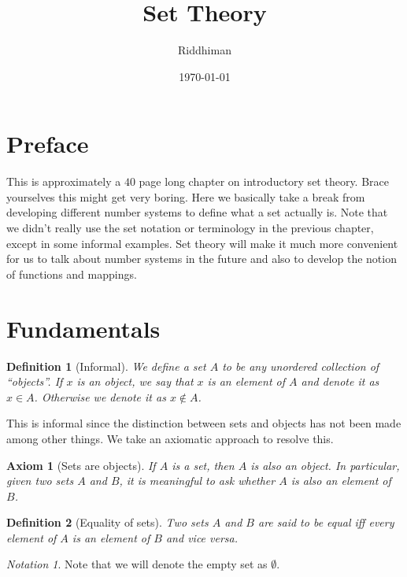 \documentclass[12pt]{article}
\title{Set Theory}
\author{Riddhiman}
\date{\monthyeardate\today}
\newtheorem{axiom}{Axiom}
\newtheorem{definition}{Definition}[section]
\theoremstyle{remark}
\newtheorem*{notation}{Notation}
\begin{document}
\maketitle

\section{Preface}%
\label{sec:Preface}

This is approximately a $ 40 $ page long chapter on introductory set theory. Brace yourselves this might get very boring. Here we basically take a break from developing different number systems to define what a set actually is. Note that we didn't really use the set notation or terminology in the previous chapter, except in some informal examples. Set theory will make it much more convenient for us to talk about number systems in the future and also to develop the notion of functions and mappings.  

\section{Fundamentals}%
\label{sec:Fundamentals}
 
\begin{definition}[Informal]
	We define a \textit{set} $ A $ to be any unordered collection of ``objects''. If $ x $ is an object, we say that $ x $ \textit{is an element of} $ A $ and denote it as $ x \in A $. Otherwise we denote it as $ x \notin A $.
\end{definition}
 
This is informal since the distinction between sets and objects has not been made among other things. We take an axiomatic approach to resolve this. 

\begin{axiom}[Sets are objects]
    If $ A $ is a set, then $ A $ is also an object. In particular, given two sets $ A $ and $ B $, it is meaningful to ask whether $ A $ is also an element of $ B $. 
\end{axiom}

\begin{definition}[Equality of sets]
    Two sets $ A $ and $ B $ are said to be equal iff every element of $ A $ is an element of $ B $ and vice versa.
\end{definition}

\begin{notation}
    Note that we will denote the empty set as $ \emptyset $.
\end{notation}
\end{document}
